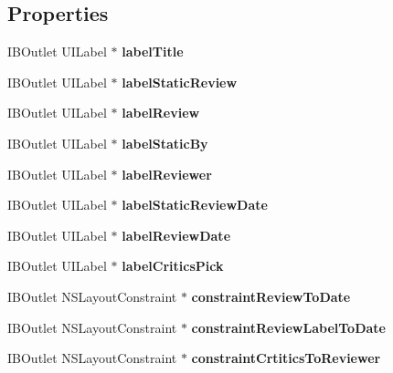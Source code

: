 \subsection*{Properties}
\begin{DoxyCompactItemize}
\item 
I\+B\+Outlet U\+I\+Label $\ast$ {\bfseries label\+Title}\label{interface_movie_list_table_view_cell_a8f4f5f7219eafd760153840aa4c2056a}

\item 
I\+B\+Outlet U\+I\+Label $\ast$ {\bfseries label\+Static\+Review}\label{interface_movie_list_table_view_cell_a3df08b2d4caedae11058f3662b1a8a0f}

\item 
I\+B\+Outlet U\+I\+Label $\ast$ {\bfseries label\+Review}\label{interface_movie_list_table_view_cell_a254097694c7c36ca9f9974c5de7d6d8d}

\item 
I\+B\+Outlet U\+I\+Label $\ast$ {\bfseries label\+Static\+By}\label{interface_movie_list_table_view_cell_acd2db877f06738d59ff7466920844ed4}

\item 
I\+B\+Outlet U\+I\+Label $\ast$ {\bfseries label\+Reviewer}\label{interface_movie_list_table_view_cell_aadefdf9e3b454a89e4f6211a0bae171d}

\item 
I\+B\+Outlet U\+I\+Label $\ast$ {\bfseries label\+Static\+Review\+Date}\label{interface_movie_list_table_view_cell_a9cb1f8445fbf52d82de111b1364d8893}

\item 
I\+B\+Outlet U\+I\+Label $\ast$ {\bfseries label\+Review\+Date}\label{interface_movie_list_table_view_cell_a5815112884bca82cd69d2e890ebcf01b}

\item 
I\+B\+Outlet U\+I\+Label $\ast$ {\bfseries label\+Critics\+Pick}\label{interface_movie_list_table_view_cell_a0f8d56f6686109a1bea27b0a9c156eb2}

\item 
I\+B\+Outlet N\+S\+Layout\+Constraint $\ast$ {\bfseries constraint\+Review\+To\+Date}\label{interface_movie_list_table_view_cell_a41e2278501e7d217272a9376cf403709}

\item 
I\+B\+Outlet N\+S\+Layout\+Constraint $\ast$ {\bfseries constraint\+Review\+Label\+To\+Date}\label{interface_movie_list_table_view_cell_aaabeb006f6834ca22161e3d29a927f2e}

\item 
I\+B\+Outlet N\+S\+Layout\+Constraint $\ast$ {\bfseries constraint\+Crtitics\+To\+Reviewer}\label{interface_movie_list_table_view_cell_a10aa2075f805a98a517bf9324e30663b}

\end{DoxyCompactItemize}


